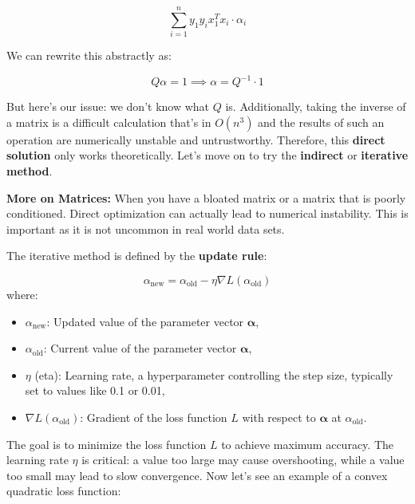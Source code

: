 \[
\sum\limits_{i=1}^{n} y_1 y_i x_1 ^T x_i \cdot \alpha_i
\]

We can rewrite this abstractly as:

\[
Q \alpha = 1 \implies \alpha = Q^{-1} \cdot 1
\]

But here's our issue: we don't know what $Q$ is. Additionally, taking the inverse of a matrix is a difficult calculation that's in $O(n^3)$ and the results of such an operation are numerically unstable and untrustworthy. Therefore, this \textbf{direct solution} only works theoretically. Let's move on to try the \textbf{indirect} or \textbf{iterative method}.

\textbf{More on Matrices:} When you have a bloated matrix or a matrix that is poorly conditioned. Direct optimization can actually lead to numerical instability. This is important as it is not uncommon in real world data sets. 

The iterative method is defined by the \textbf{update rule}:

\begin{equation}
    \alpha_{\text{new}} = \alpha_{\text{old}} - \eta \nabla L(\alpha_{\text{old}})
\end{equation}
where:
\begin{itemize}
    \item \( \alpha_{\text{new}} \): Updated value of the parameter vector \( \boldsymbol{\alpha} \),
    \item \( \alpha_{\text{old}} \): Current value of the parameter vector \( \boldsymbol{\alpha} \),
    \item \( \eta \) (eta): Learning rate, a hyperparameter controlling the step size, typically set to values like 0.1 or 0.01,
    \item \( \nabla L(\alpha_{\text{old}}) \): Gradient of the loss function \( L \) with respect to \( \boldsymbol{\alpha} \) at \( \alpha_{\text{old}} \).
\end{itemize}

The goal is to minimize the loss function \( L \) to achieve maximum accuracy. The learning rate \( \eta \) is critical: a value too large may cause overshooting, while a value too small may lead to slow convergence. Now let's see an example of a convex quadratic loss function:

\begin{center}
\end{center}

